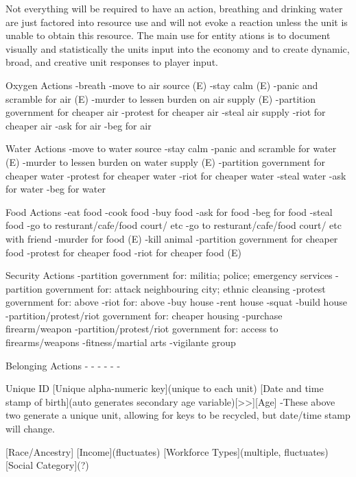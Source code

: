 Not everything will be required to have an action, breathing and drinking water are just factored into resource use and will not evoke a reaction unless the unit is unable to obtain this resource. The main use for entity ations is to document visually and statistically the units input into the economy and to create dynamic, broad, and creative unit responses to player input.

Oxygen Actions
-breath 
-move to air source (E)
-stay calm (E)
-panic and scramble for air (E)
-murder to lessen burden on air supply (E)
-partition government for cheaper air
-protest for cheaper air
-steal air supply
-riot for cheaper air
-ask for air
-beg for air

Water Actions
-move to water source
-stay calm
-panic and scramble for water (E)
-murder to lessen burden on water supply (E)
-partition government for cheaper water
-protest for cheaper water
-riot for cheaper water
-steal water
-ask for water
-beg for water


Food Actions
-eat food
-cook food
-buy food
-ask for food
-beg for food
-steal food 
-go to resturant/cafe/food court/ etc
-go to resturant/cafe/food court/ etc with friend
-murder for food (E)
-kill animal
-partition government for cheaper food
-protest for cheaper food
-riot for cheaper food (E)


Security Actions
-partition government for: militia; police; emergency services
-partition government for: attack neighbouring city; ethnic cleansing
-protest government for: above
-riot for: above
-buy house
-rent house
-squat
-build house
-partition/protest/riot government for: cheaper housing
-purchase firearm/weapon
-partition/protest/riot government for: access to firearms/weapons
-fitness/martial arts
-vigilante group


Belonging Actions
-
-
-
-
-
-








Unique ID
[Unique alpha-numeric key](unique to each unit)
[Date and time stamp of birth](auto generates secondary age variable)[>>][Age]
-These above two generate a unique unit, allowing for keys to be recycled, but date/time stamp will change.

[Race/Ancestry]
[Income](fluctuates)
[Workforce Types](multiple, fluctuates)
[Social Category](?)

